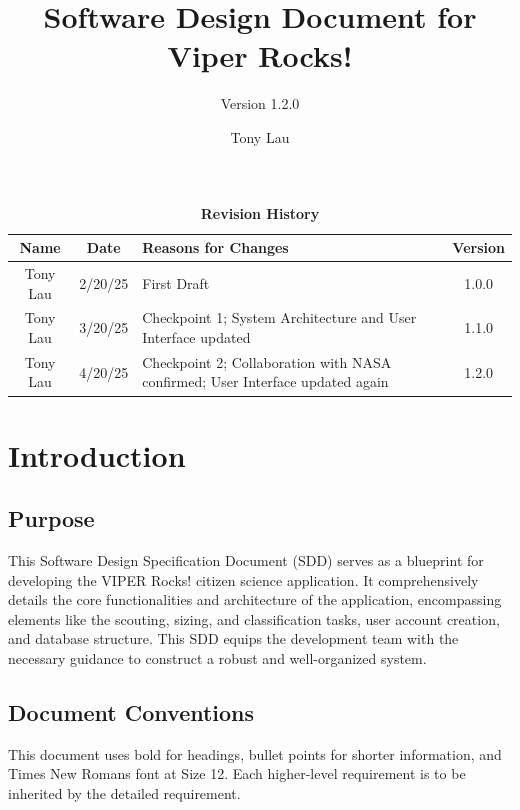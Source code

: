 \documentclass{article}
\begin{document}
\title{Software Design Document for Viper Rocks!}
\author{Version 1.2.0}
\date{Tony Lau}

\maketitle
\tableofcontents
\newpage

\fancyhf{}
\fancyfoot[C]{\thepage}

\begin{table}[h!]
\centering
\caption{\textbf{Revision History}}
\begin{tabularx}{\textwidth}{|c|c|X|c|}
\hline
\textbf{Name} & \textbf{Date} & \textbf{Reasons for Changes} & \textbf{Version} \\
\hline
Tony Lau & 2/20/25 & First Draft & 1.0.0 \\
\hline
Tony Lau & 3/20/25 & Checkpoint 1; System Architecture and User Interface updated & 1.1.0 \\
\hline
Tony Lau & 4/20/25 & Checkpoint 2; Collaboration with NASA confirmed; User Interface updated again & 1.2.0 \\
\hline

\hline
\end{tabularx}
\end{table}

\section{Introduction}
\subsection{Purpose}
This Software Design Specification Document (SDD) serves as a blueprint for developing the VIPER Rocks! citizen science application. It comprehensively details the core functionalities and architecture of the application, encompassing elements like the scouting, sizing, and classification tasks, user account creation, and database structure. This SDD equips the development team with the necessary guidance to construct a robust and well-organized system.
\subsection{Document Conventions}
This document uses bold for headings, bullet points for shorter information, and Times New Romans font at Size 12. Each higher-level requirement is to be inherited by the detailed requirement.
\end{document}
